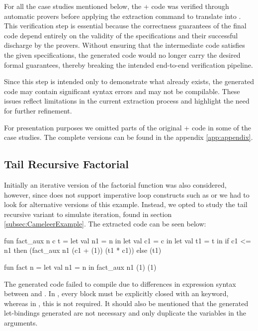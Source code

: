 For all the case studies mentioned below, the \ocaml + \gospel code was verified through \whythree automatic
provers before applying the extraction command to translate into \cml. This verification step is essential because the correctness 
guarantees of the final \cml code depend entirely on the validity of the specifications and their successful discharge by the 
provers. Without ensuring that the \whyml intermediate code satisfies the given specifications, the generated \cml code would 
no longer carry the desired formal guarantees, thereby breaking the intended end-to-end verification pipeline.

Since this step is intended only to demonstrate what already exists, the generated code may contain significant syntax errors 
and may not be compilable. These issues reflect limitations in the current extraction process and highlight the need for 
further refinement.

For presentation purposes we omitted parts of the original \ocaml + \gospel code in some of the case studies. The complete 
versions can be found in the appendix \ref{app:appendix}.

\subsection{Tail Recursive Factorial}

Initially an iterative version of the factorial function was also considered, however, since \cml does not support imperative loop 
constructs such as  or  we had to look for alternative versions of this example. Instead, we opted 
to study the tail recursive variant to simulate iteration, found in section \ref{subsec:CameleerExample}. The extracted code can be seen below:

\begin{cakeml}
fun fact_aux n c t = let val n1 = n in
  let val c1 = c in
  let val t1 = t in
  if c1 <= n1 then (fact_aux n1 (c1 + (1)) (t1 * c1))  else (t1)

fun fact n = let val n1 = n in fact_aux n1 (1) (1)
\end{cakeml}

The generated \cml code failed to compile due to differences in  expression syntax between \ocaml and \cml. In \cml, every 
 block must be explicitly closed with an  keyword, whereas in \ocaml, this is not required. It should
also be mentioned that the generated let-bindings generated are not necessary and only duplicate the variables in the arguments.

